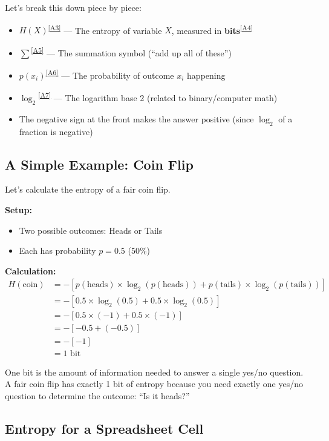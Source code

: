 \documentclass[11pt,a4paper]{article}
\newcommand{\term}[2]{\textcolor{termcolor}{\textbf{#1}}\textsuperscript{\hyperref[#2]{[#2]}}}
\begin{document}
Let's break this down piece by piece:

\begin{itemize}
    \item \term{$H(X)$}{A3} --- The entropy of variable $X$, measured in \term{bits}{A4}
    \item \term{$\sum$}{A5} --- The summation symbol (``add up all of these'')
    \item \term{$p(x_i)$}{A6} --- The probability of outcome $x_i$ happening
    \item \term{$\log_2$}{A7} --- The logarithm base 2 (related to binary/computer math)
    \item The negative sign at the front makes the answer positive (since $\log_2$ of a fraction is negative)
\end{itemize}

\subsection{A Simple Example: Coin Flip}

Let's calculate the entropy of a fair coin flip.

\textbf{Setup:}
\begin{itemize}
    \item Two possible outcomes: Heads or Tails
    \item Each has probability $p = 0.5$ (50\%)
\end{itemize}

\textbf{Calculation:}
\begin{align}
H(\text{coin}) &= -[p(\text{heads}) \times \log_2(p(\text{heads})) + p(\text{tails}) \times \log_2(p(\text{tails}))] \\
&= -[0.5 \times \log_2(0.5) + 0.5 \times \log_2(0.5)] \\
&= -[0.5 \times (-1) + 0.5 \times (-1)] \\
&= -[-0.5 + (-0.5)] \\
&= -[-1] \\
&= 1 \text{ bit}
\end{align}

\begin{infobox}
One bit is the amount of information needed to answer a single yes/no question. A fair coin flip has exactly 1 bit of entropy because you need exactly one yes/no question to determine the outcome: ``Is it heads?''
\end{infobox}

\subsection{Entropy for a Spreadsheet Cell}
\end{document}
